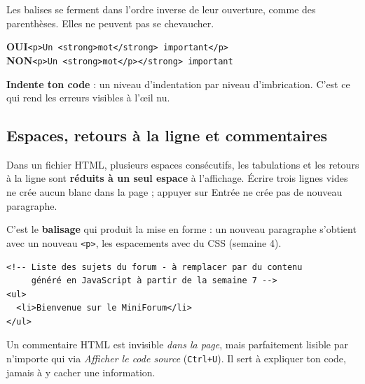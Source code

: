 \documentclass[a4paper,11pt]{article}
\begin{document}
\begin{tcolorbox}[attention, title={La règle d'imbrication : premier ouvert, dernier fermé}]
Les balises se ferment dans l'ordre inverse de leur ouverture, comme des parenthèses. Elles ne peuvent pas se chevaucher.

\vspace{4pt}
\textcolor{successGreen}{\textbf{OUI}}\quad \texttt{<p>Un <strong>mot</strong> important</p>}\\[3pt]
\textcolor{alertRed}{\textbf{NON}}\quad \texttt{<p>Un <strong>mot</p></strong> important}

\vspace{4pt}
\textbf{Indente ton code} : un niveau d'indentation par niveau d'imbrication. C'est ce qui rend les erreurs visibles à l'\oe il nu.
\end{tcolorbox}

\subsection{Espaces, retours à la ligne et commentaires}

\begin{tcolorbox}[attention, title={Le HTML ignore ta mise en forme du texte}]
Dans un fichier HTML, plusieurs espaces consécutifs, les tabulations et les retours à la ligne sont \textbf{réduits à un seul espace} à l'affichage. Écrire trois lignes vides ne crée aucun blanc dans la page ; appuyer sur Entrée ne crée pas de nouveau paragraphe.

\vspace{4pt}
C'est le \textbf{balisage} qui produit la mise en forme : un nouveau paragraphe s'obtient avec un nouveau \texttt{<p>}, les espacements avec du CSS (semaine 4).
\end{tcolorbox}

\begin{lstlisting}[language=HTML5, caption={Un commentaire n'est pas affiché dans la page}]
<!-- Liste des sujets du forum - à remplacer par du contenu
     généré en JavaScript à partir de la semaine 7 -->
<ul>
  <li>Bienvenue sur le MiniForum</li>
</ul>
\end{lstlisting}

\begin{tcolorbox}[astuce, title={Le commentaire n'est pas un secret}]
Un commentaire HTML est invisible \textit{dans la page}, mais parfaitement lisible par n'importe qui via \textit{Afficher le code source} (\texttt{Ctrl+U}). Il sert à expliquer ton code, jamais à y cacher une information.
\end{tcolorbox}
\end{document}
